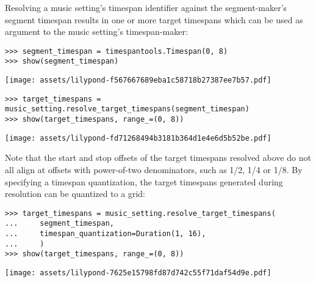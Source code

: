 \noindent Resolving a music setting's timespan identifier against the
segment-maker's segment timespan results in one or more target timespans which
can be used as argument to the music setting's timespan-maker:

\begin{comment}
<abjad>
segment_timespan = timespantools.Timespan(0, 8)
show(segment_timespan)
target_timespans = music_setting.resolve_target_timespans(segment_timespan)
show(target_timespans, range_=(0, 8))
</abjad>
\end{comment}

\begin{abjadbookoutput}
\begin{singlespacing}
\vspace{-0.5\baselineskip}
\begin{verbatim}
>>> segment_timespan = timespantools.Timespan(0, 8)
>>> show(segment_timespan)
\end{verbatim}
\noindent\texttt{[image: assets/lilypond-f567667689eba1c58718b27387ee7b57.pdf]}
\begin{verbatim}
>>> target_timespans = music_setting.resolve_target_timespans(segment_timespan)
>>> show(target_timespans, range_=(0, 8))
\end{verbatim}
\noindent\texttt{[image: assets/lilypond-fd71268494b3181b364d1e4e6d5b52be.pdf]}
\end{singlespacing}
\end{abjadbookoutput}

\noindent Note that the start and stop offsets of the target timespans resolved
above do not all align at offsets with power-of-two denominators, such as 1/2,
1/4 or 1/8. By specifying a timespan quantization, the target timespans
generated during resolution can be quantized to a grid:

\begin{comment}
<abjad>
target_timespans = music_setting.resolve_target_timespans(
    segment_timespan,
    timespan_quantization=Duration(1, 16),
    )
show(target_timespans, range_=(0, 8))
</abjad>
\end{comment}

\begin{abjadbookoutput}
\begin{singlespacing}
\vspace{-0.5\baselineskip}
\begin{verbatim}
>>> target_timespans = music_setting.resolve_target_timespans(
...     segment_timespan,
...     timespan_quantization=Duration(1, 16),
...     )
>>> show(target_timespans, range_=(0, 8))
\end{verbatim}
\noindent\texttt{[image: assets/lilypond-7625e15798fd87d742c55f71daf54d9e.pdf]}
\end{singlespacing}
\end{abjadbookoutput}

